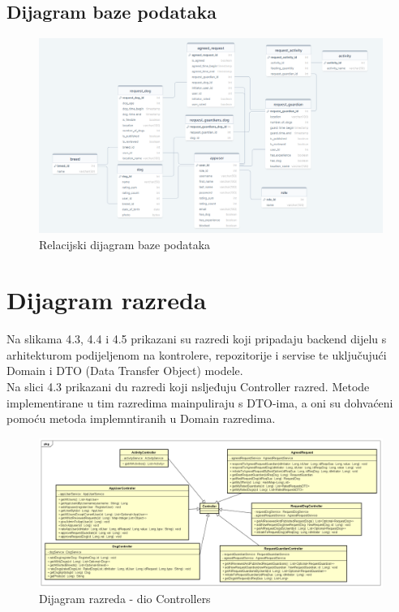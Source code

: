 			\eject
			\subsection{Dijagram baze podataka}
			
			\begin{figure}[htb]
				\centering
				\includegraphics[width=16cm]{slike/drawsql REL}
				\caption{Relacijski dijagram baze podataka} 
				\label{fig:E-Rdijagram}
			\end{figure}
			
			\eject
			
			
		\section{Dijagram razreda}
		
			Na slikama 4.3, 4.4 i 4.5 prikazani su razredi koji pripadaju backend dijelu s arhitekturom podijeljenom na kontrolere, repozitorije i servise te uključujući Domain i DTO (Data Transfer Object) modele.\\
			Na slici 4.3 prikazani du razredi koji nsljeđuju Controller razred. Metode implementirane u tim razredima mainpuliraju s DTO-ima, a oni su dohvaćeni pomoću metoda implemntiranih u Domain razredima.
			
			\begin{figure}[htb]
				\centering
				\includegraphics[width=16cm]{slike/dijagram_razreda_controllers}
				\caption{Dijagram razreda - dio Controllers} 
				\label{fig:Class-Diagram}
			\end{figure}
		

